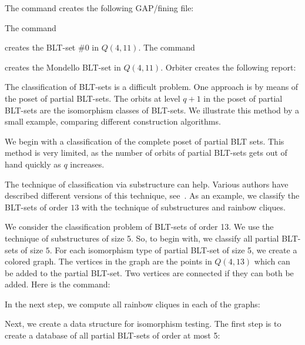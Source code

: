 
The command creates the following GAP/fining file:

\bigskip

The command


creates the BLT-set \#0 in $Q(4,11).$
The command


creates the Mondello BLT-set in $Q(4,11).$
Orbiter creates the following report:



\bigskip

The classification of BLT-sets is a difficult problem. 
One approach is by means of the poset of partial BLT-sets. 
The orbits at level $q+1$ in the poset of partial BLT-sets 
are the isomorphism classes of BLT-sets. 
We illustrate this method by a small example, comparing different construction algorithms.

We begin with a classification of the complete poset of partial BLT sets. 
This method is very limited, as the number of orbits of partial BLT-sets 
gets out of hand quickly as $q$ increases.



The technique of classification via substructure can help.
Various authors have described different versions of this technique,  
see~\cite{AlAzemiBettenChowdhury18,Betten13,Law03}.
As an example, we classify the BLT-sets of order $13$ 
with the technique of substructures and rainbow cliques.

\bigskip

We consider the classification problem of BLT-sets of order 13. 
We use the technique of substructures of size 5.
So, to begin with, we classify all partial BLT-sets 
of size $5$. 
For each isomorphism type of partial BLT-set of size 5, 
we create a colored graph.
The vertices in the graph are the points in $Q(4,13)$ 
which can be added to the partial BLT-set.
Two vertices are connected if they can both be added.
Here is the command:


In the next step, we compute all rainbow cliques in each of the graphs:


Next, we create a data structure for isomorphism testing. 
The first step is to create a database of 
all partial BLT-sets of order at most 5:


